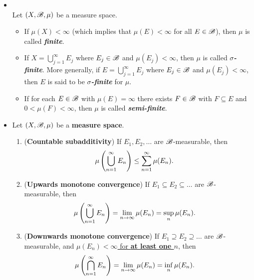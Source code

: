 \documentclass[11pt]{article}
\begin{document}
\begin{itemize}
\item \begin{definition} \citep{folland2013real}\\
Let $(X, {\mathscr B}, \mu)$ be a measure space. 
\begin{itemize}
\item If $\mu(X)< \infty$ (which implies that $\mu(E) < \infty$ for all $E \in {\mathscr B}$), then $\mu$ is called \emph{\textbf{finite}}. 
\item If $X = \bigcup_{j=1}^{\infty}E_j$ where $E_j \in {\mathscr B}$ and $\mu(E_j) < \infty$, then $\mu$ is called \emph{\textbf{$\sigma$-finite}}. More generally, if $E = \bigcup_{j=1}^{\infty}E_j$ where $E_j \in {\mathscr B}$ and $\mu(E_j) < \infty$, then $E$ is said to be \emph{\textbf{$\sigma$-finite}} for $\mu$.
\item If for each $E \in {\mathscr B}$ with $\mu(E) = \infty$ there exists $F\in {\mathscr B}$ with $F \subseteq E$ and $0 < \mu(F) < \infty$, then $\mu$ is called \emph{\textbf{semi-finite}}.
\end{itemize}
\end{definition}

\item \begin{proposition} 
Let $(X, {\mathscr B}, \mu)$ be a \textbf{measure space}.
\begin{enumerate}
\item (\textbf{Countable subadditivity}) If $E_1, E_2, \ldots $ are ${\mathscr B}$-measurable, then 
\begin{align*}
\mu\left(\bigcup_{n=1}^{\infty} E_n\right) &\le \sum_{n=1}^{\infty} \mu(E_n).
\end{align*}
\item (\textbf{Upwards monotone convergence}) If $E_1 \subseteq E_2 \subseteq \ldots$ are ${\mathscr B}$-measurable, then
\begin{align}
\mu\left(\bigcup_{n=1}^{\infty} E_n\right) &= \lim\limits_{n\rightarrow \infty}\mu(E_n) = \sup\limits_{n}\mu(E_n). \label{eqn: countable_additive_measure_upward_monotone_convergence}
\end{align}
\item (\textbf{Downwards monotone convergence}) If $E_1 \supseteq E_2 \supseteq \ldots$ are ${\mathscr B}$-measurable, and \underline{$\mu(E_n) < \infty$ for \textbf{at least one $n$}}, then
\begin{align}
\mu\left(\bigcap_{n=1}^{\infty} E_n\right) &= \lim\limits_{n\rightarrow \infty}\mu(E_n) = \inf\limits_{n}\mu(E_n). \label{eqn: countable_additive_measure_downward_monotone_convergence}
\end{align}
\end{enumerate}
\end{proposition}



\end{itemize}
\end{document}
